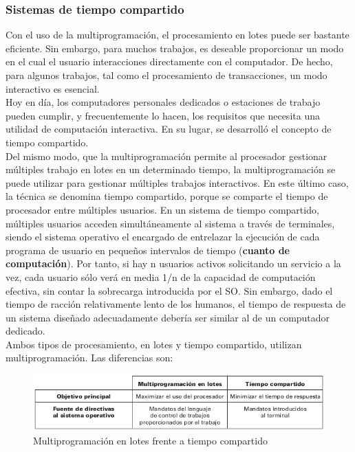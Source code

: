 \documentclass{article}
\begin{document}
				\subsubsection{Sistemas de tiempo compartido}
					Con el uso de la multiprogramación, el procesamiento en lotes puede ser bastante eficiente. Sin embargo, para muchos trabajos, es deseable proporcionar un modo en el cual el usuario interacciones directamente con el computador. De hecho, para algunos trabajos, tal como el procesamiento de transacciones, un modo interactivo es esencial.	\\
					
					Hoy en día, los computadores personales dedicados o estaciones de trabajo pueden cumplir, y frecuentemente lo hacen, los requisitos que necesita una utilidad de computación interactiva. En su lugar, se desarrolló el concepto de tiempo compartido. \\
					
					Del mismo modo, que la multiprogramación permite al procesador gestionar múltiples trabajo en lotes en un determinado tiempo, la multiprogramación se puede utilizar para gestionar múltiples trabajos interactivos. En este último caso, la técnica se denomina tiempo compartido, porque se comparte el tiempo de procesador entre múltiples usuarios. En un sistema de tiempo compartido, múltiples usuarios acceden simultáneamente al sistema a través de terminales, siendo el sistema operativo el encargado de entrelazar la ejecución de cada programa de usuario en pequeños intervalos de tiempo (\textbf{cuanto de computación}). Por tanto, si hay n usuarios activos solicitando un servicio a la vez, cada usuario sólo verá en media 1/n de la capacidad de computación efectiva, sin contar la sobrecarga introducida por el SO. Sin embargo, dado el tiempo de racción relativamente lento de los humanos, el tiempo de respuesta de un sistema diseñado adecuadamente debería ser similar al de un computador dedicado. \\
					
					Ambos tipos de procesamiento, en lotes y tiempo compartido, utilizan multiprogramación. Las diferencias son:
					
				\begin{figure}
				\caption{Multiprogramación en lotes frente a tiempo compartido}
				\label{figura17:lotes-tiempocompartido}
				\centering
				\includegraphics[width=1\textwidth, scale=1]{figura17.png}
				\end{figure}	
				
\end{document}
